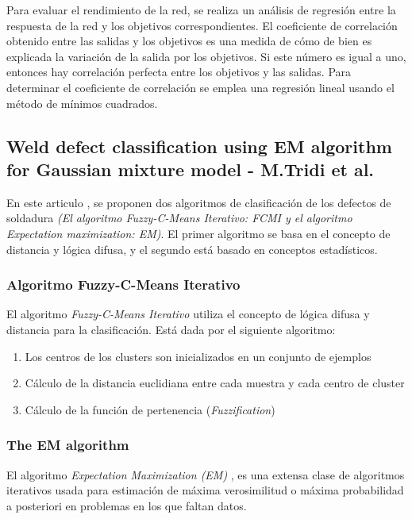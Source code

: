 Para evaluar el rendimiento de la red, se realiza un análisis de regresión entre la respuesta de la red y los objetivos correspondientes. El coeficiente de correlación obtenido entre las salidas y los objetivos es una medida de cómo de bien es explicada la variación de la salida por los objetivos. Si este número es igual a uno, entonces hay correlación perfecta entre los objetivos y las salidas. Para determinar el coeficiente de correlación se emplea una regresión lineal usando el método de mínimos cuadrados.


\subsection{Weld defect classification using EM algorithm for Gaussian mixture model - M.Tridi et al.}
En este articulo \cite{Tridi}, se proponen dos algoritmos de clasificación de los defectos de soldadura  \textit{(El algoritmo Fuzzy-C-Means Iterativo: FCMI y el algoritmo Expectation maximization: EM)}.
El primer algoritmo se basa en el concepto de distancia y lógica difusa, y el segundo está basado en conceptos estadísticos. 


\subsubsection{Algoritmo Fuzzy-C-Means Iterativo} 
El algoritmo \textit{Fuzzy-C-Means Iterativo} \cite{kandel1999introduction} utiliza el concepto de lógica difusa y distancia para la clasificación. Está dada por el siguiente algoritmo:
	\begin{enumerate}
	\item Los centros de los clusters son inicializados en un conjunto de ejemplos
	\item Cálculo de la distancia euclidiana entre cada muestra y cada centro de cluster
	\item Cálculo de la función de pertenencia (\emph{Fuzzification}) 
	\end{enumerate}


\subsubsection{The EM algorithm}
El algoritmo \textit{Expectation Maximization (EM)} \cite{zhang2003algorithms}, es una extensa clase de algoritmos iterativos usada para estimación de máxima verosimilitud o máxima probabilidad a posteriori en problemas en los que faltan datos.


